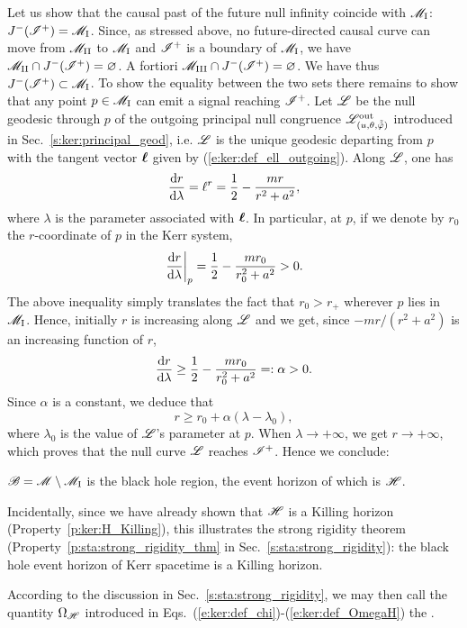Let us show that the causal past of the future null infinity
coincide with $\mathscr{M}_{\rm I}$: $J^{-}(\mathscr{I}^+)=\mathscr{M}_{\rm I}$.
Since, as stressed above, no future-directed causal curve can move from $\mathscr{M}_{\rm II}$ to $\mathscr{M}_{\rm I}$
and $\mathscr{I}^+$ is a boundary of $\mathscr{M}_{\rm I}$, we have $\mathscr{M}_{\rm II} \cap J^{-}(\mathscr{I}^+) = \varnothing$. A fortiori $\mathscr{M}_{\rm III} \cap J^{-}(\mathscr{I}^+) = \varnothing$.
We have thus $J^{-}(\mathscr{I}^+)\subset \mathscr{M}_{\rm I}$. To show the equality between the
two sets there remains to show
that any point $p\in \mathscr{M}_{\rm I}$ can emit a signal reaching $\mathscr{I}^+$.
Let $\mathscr{L}$ be the null geodesic through $p$ of the outgoing principal null
congruence $\mathscr{L}^{\rm out}_{(u,\theta,\tilde{{\tilde\varphi}})}$ introduced in Sec.~\ref{s:ker:principal_geod}, i.e. $\mathscr{L}$ is the unique geodesic departing
from $p$ with the tangent vector $\bm{\ell}$ given by
(\ref{e:ker:def_ell_outgoing}). Along $\mathscr{L}$, one has
\[
   \frac{\mathrm{d} r}{\mathrm{d}\lambda} = \ell^r = \frac{1}{2} - \frac{m r}{r^2 + a^2} ,
\]
where $\lambda$ is the parameter associated with $\bm{\ell}$.
In particular, at $p$, if we denote by $r_0$ the $r$-coordinate of $p$ in the Kerr system,
\[
    \left. \frac{\mathrm{d} r}{\mathrm{d}\lambda} \right| _{p} = \frac{1}{2} - \frac{m r_0}{r_0^2 + a^2} > 0 .
\]
The above inequality simply translates the fact that $r_0 > r_+$ wherever $p$ lies in
$\mathscr{M}_{\rm I}$.
Hence, initially $r$ is increasing along $\mathscr{L}$ and we get, since $-mr/(r^2+a^2)$ is an
increasing function of $r$,
\[
    \frac{\mathrm{d} r}{\mathrm{d}\lambda} \geq \frac{1}{2} - \frac{m r_0}{r_0^2 + a^2} =: \alpha > 0.
\]
Since $\alpha$ is a constant, we deduce that
\[
    r \geq r_0 + \alpha(\lambda - \lambda_0) ,
\]
where $\lambda_0$ is the value of $\mathscr{L}$'s parameter at $p$. When $\lambda\rightarrow +\infty$,
we get $r\rightarrow +\infty$, which proves that the null curve $\mathscr{L}$
reaches $\mathscr{I}^+$. Hence we conclude:
\begin{prop}
$\mathscr{B} = \mathscr{M} \setminus \mathscr{M}_{\rm I}$ is the black hole region, the event
horizon of which is $\mathscr{H}$.
\end{prop}
Incidentally, since we have already shown that $\mathscr{H}$ is a Killing horizon
(Property~\ref{p:ker:H_Killing}),
this illustrates the strong rigidity theorem
(Property~\ref{p:sta:strong_rigidity_thm} in Sec.~\ref{s:sta:strong_rigidity}): the
black hole event horizon of Kerr spacetime
is a Killing horizon.

According to the discussion in Sec.~\ref{s:sta:strong_rigidity}, we may then
call the quantity $\Omega_{\mathscr{H}}$ introduced in
Eqs.~(\ref{e:ker:def_chi})-(\ref{e:ker:def_OmegaH}) the
.

